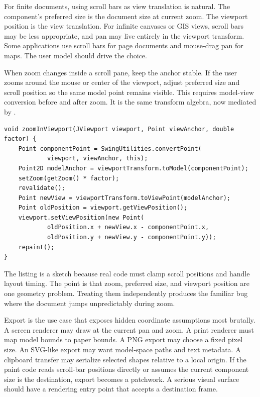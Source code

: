 For finite documents, using scroll bars as view translation is natural. The component's preferred size is the document size at current zoom. The viewport position is the view translation. For infinite canvases or GIS views, scroll bars may be less appropriate, and pan may live entirely in the viewport transform. Some applications use scroll bars for page documents and mouse-drag pan for maps. The user model should drive the choice.

When zoom changes inside a scroll pane, keep the anchor stable. If the user zooms around the mouse or center of the viewport, adjust preferred size and scroll position so the same model point remains visible. This requires model-view conversion before and after zoom. It is the same transform algebra, now mediated by .

\begin{lstlisting}[caption={Keeping a model anchor visible while zooming a scrollable canvas.}]
void zoomInViewport(JViewport viewport, Point viewAnchor, double factor) {
    Point componentPoint = SwingUtilities.convertPoint(
            viewport, viewAnchor, this);
    Point2D modelAnchor = viewportTransform.toModel(componentPoint);
    setZoom(getZoom() * factor);
    revalidate();
    Point newView = viewportTransform.toViewPoint(modelAnchor);
    Point oldPosition = viewport.getViewPosition();
    viewport.setViewPosition(new Point(
            oldPosition.x + newView.x - componentPoint.x,
            oldPosition.y + newView.y - componentPoint.y));
    repaint();
}
\end{lstlisting}

The listing is a sketch because real code must clamp scroll positions and handle layout timing. The point is that zoom, preferred size, and viewport position are one geometry problem. Treating them independently produces the familiar bug where the document jumps unpredictably during zoom.

Export is the use case that exposes hidden coordinate assumptions most brutally. A screen renderer may draw at the current pan and zoom. A print renderer must map model bounds to paper bounds. A PNG export may choose a fixed pixel size. An SVG-like export may want model-space paths and text metadata. A clipboard transfer may serialize selected shapes relative to a local origin. If the paint code reads scroll-bar positions directly or assumes the current component size is the destination, export becomes a patchwork. A serious visual surface should have a rendering entry point that accepts a destination frame.


